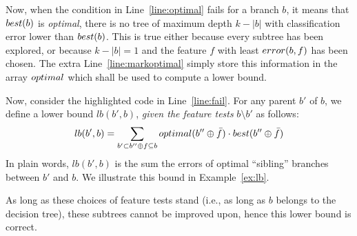 \documentclass{llncs}
\newcommand{\lb}[1]{\ensuremath{lb({#1})}}
\newcommand{\bud}[0]{\ensuremath{{\cal B}}}
\newcommand{\sequence}[0]{\ensuremath{{\cal S}}}
\newcommand{\afeat}[0]{\ensuremath{f}}
\newcommand{\dom}[1][]{\ensuremath{\ifthenelse{\equal{#1}{}}{dom}{dom({#1})}}}
\newcommand{\best}[1][]{\ensuremath{\ifthenelse{\equal{#1}{}}{{best}}{{best({#1})}}}}
\newcommand{\opt}[1][]{\ensuremath{\ifthenelse{\equal{#1}{}}{optimal}{optimal({#1})}}}
\newcommand{\error}[1][]{\ensuremath{\ifthenelse{\equal{#1}{}}{{error}}{{error({{#1}})}}}}
\newcommand{\abranch}[0]{\ensuremath{b}}
\newcommand{\mdepth}[0]{\ensuremath{k}}
\newcommand{\grow}[2]{\ensuremath{{#1}\oplus{#2}}}
\begin{document}
Now, when the condition in Line~\ref{line:optimal} fails for a branch $\abranch$, it means that $\best[\abranch]$ is \emph{optimal}, there is no tree of maximum depth $\mdepth - |\abranch|$ with classification error lower than $\best[\abranch]$. This is true either because every subtree has been explored, or because $\mdepth - |\abranch| = 1$ and the feature $\afeat$ with least $\error[\abranch,\afeat]$ has been chosen. The extra Line~\ref{line:markoptimal} simply store this information in the array $\opt$ which shall be used to compute a lower bound.



Now, consider the highlighted code in Line~\ref{line:fail}.
For any parent $\abranch'$ of $\abranch$, we define a lower bound $\lb{\abranch',\abranch}$, \emph{given the feature tests} $\abranch \setminus \abranch'$ as follows:
$$
\lb{\abranch',\abranch} = \sum\limits_{\abranch' \subset \grow{\abranch''}{\afeat} \subseteq \abranch}\opt[\grow{\abranch''}{\bar{\afeat}}] \cdot \best[\grow{\abranch''}{\bar{\afeat}}]
$$
In plain words, $\lb{\abranch',\abranch}$ is the sum the errors of optimal ``sibling'' branches between $\abranch'$ and $\abranch$. We illustrate this bound in Example~\ref{ex:lb}.

As long as these choices of feature tests stand (i.e., as long as $\abranch$ belongs to the decision tree), these subtrees cannot be improved upon, hence this lower bound is correct.


%
\end{document}
